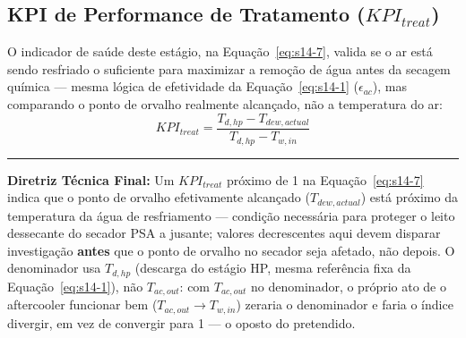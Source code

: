 \documentclass[12pt,a4paper]{article}
\numberwithin{equation}{section}
\numberwithin{table}{section}
\numberwithin{figure}{section}
\begin{document}
{	\begin{table}[h!tbp]
		\centering
		\caption[Matriz de diagnóstico de tratamento primário]{Matriz de diagnóstico de tratamento primário.}
		\label{tab:14-1}
	\end{table}

	\subsection{KPI de Performance de Tratamento (\texorpdfstring{$KPI_{treat}$}{KPI treat})}
	O indicador de saúde deste estágio, na Equação~\eqref{eq:s14-7}, valida se o ar está sendo resfriado o suficiente para maximizar a remoção de água antes da secagem química — mesma lógica de efetividade da Equação~\eqref{eq:s14-1} ($\epsilon_{ac}$), mas comparando o ponto de orvalho realmente alcançado, não a temperatura do ar:
	\begin{equation}\label{eq:s14-7}
 \boxed{KPI_{treat} = \frac{T_{d,hp} - T_{dew,actual}}{T_{d,hp} - T_{w,in}}}
\end{equation}

	\vspace{1em}
	\hrule
	\vspace{1em}

	\textbf{Diretriz Técnica Final:} Um $KPI_{treat}$ próximo de 1 na Equação~\eqref{eq:s14-7} indica que o ponto de orvalho efetivamente alcançado ($T_{dew,actual}$) está próximo da temperatura da água de resfriamento — condição necessária para proteger o leito dessecante do secador PSA a jusante; valores decrescentes aqui devem disparar investigação \textbf{antes} que o ponto de orvalho no secador seja afetado, não depois. O denominador usa $T_{d,hp}$ (descarga do estágio HP, mesma referência fixa da Equação~\eqref{eq:s14-1}), não $T_{ac,out}$: com $T_{ac,out}$ no denominador, o próprio ato de o aftercooler funcionar bem ($T_{ac,out} \to T_{w,in}$) zeraria o denominador e faria o índice divergir, em vez de convergir para 1 — o oposto do pretendido.

}
\end{document}
